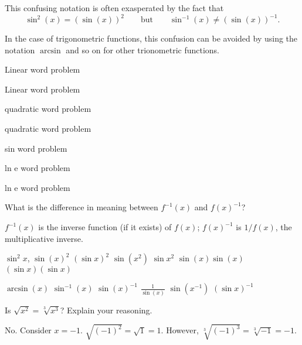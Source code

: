 This confusing notation is often exasperated by the fact that 
\[
\sin^2(x) = (\sin(x))^2\qquad \text{but} \qquad \sin^{-1}(x)
\ne(\sin(x))^{-1}.
\]

In the case of trigonometric functions, this confusion can be avoided
by using the notation $\arcsin$ and so on for other trionometric
functions.




\begin{exercises}

\begin{exercise}
Linear word problem
\end{exercise}

\begin{exercise}
Linear word problem
\end{exercise}

\begin{exercise}
quadratic word problem
\end{exercise}

\begin{exercise}
quadratic word problem
\end{exercise}


\begin{exercise}
sin word problem
\end{exercise}


\begin{exercise}
ln e word problem
\end{exercise}

\begin{exercise}
ln e word problem
\end{exercise}





\begin{exercise}
What is the difference in meaning between $f^{-1}(x)$ and $f(x)^{-1}$?
\begin{answer}
$f^{-1}(x)$ is the inverse function (if it exists) of $f(x)$;
  $f(x)^{-1}$ is $1/f(x)$, the multiplicative inverse.
\end{answer}
\end{exercise}



\begin{exercise}
$\sin^2 x$, $\sin(x)^2$  $(\sin x)^2$ $\sin(x^2)$ $\sin x^2$ $\sin(x) \sin(x)$ $(\sin x)(\sin x)$
\end{exercise}

\begin{exercise}
$\arcsin(x)$ $\sin^{-1}(x)$ $\sin(x)^{-1}$ $\frac{1}{\sin(x)}$ $\sin(x^{-1})$  $(\sin x)^{-1}$
\end{exercise}

\begin{exercise} 
Is $\sqrt{x^2} = \sqrt[3]{x^3}$? Explain your reasoning.
\begin{answer}
No. Consider $x = -1$. $\sqrt{(-1)^2} = \sqrt{1} = 1$. However, $\sqrt[3]{(-1)^3} =  \sqrt[3]{-1} = -1$.  
\end{answer}
\end{exercise}



\end{exercises}
